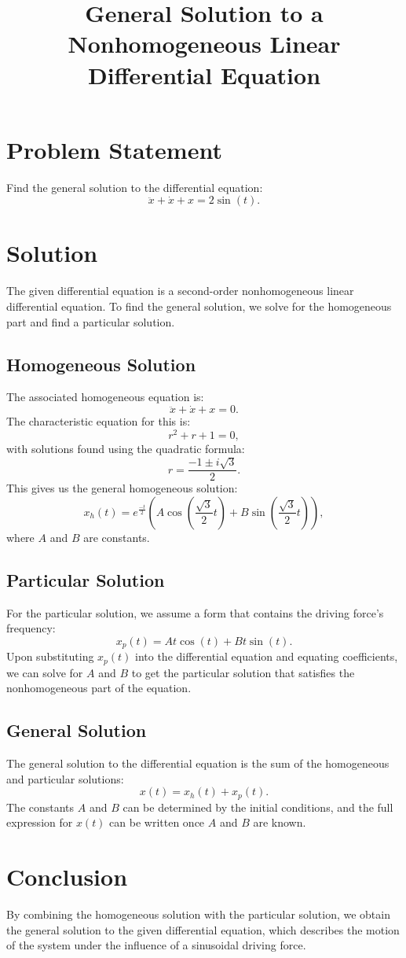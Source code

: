\documentclass{article}
\begin{document}
\title{General Solution to a Nonhomogeneous Linear Differential Equation}
\date{}
\maketitle

\section*{Problem Statement}
Find the general solution to the differential equation:
\[ \ddot{x} + \dot{x} + x = 2\sin(t). \]

\section*{Solution}
The given differential equation is a second-order nonhomogeneous linear differential equation. To find the general solution, we solve for the homogeneous part and find a particular solution.

\subsection*{Homogeneous Solution}
The associated homogeneous equation is:
\[ \ddot{x} + \dot{x} + x = 0. \]
The characteristic equation for this is:
\[ r^2 + r + 1 = 0, \]
with solutions found using the quadratic formula:
\[ r = \frac{-1 \pm i\sqrt{3}}{2}. \]
This gives us the general homogeneous solution:
\[ x_h(t) = e^{\frac{-t}{2}}\left( A\cos\left(\frac{\sqrt{3}}{2}t\right) + B\sin\left(\frac{\sqrt{3}}{2}t\right) \right), \]
where \( A \) and \( B \) are constants.

\subsection*{Particular Solution}
For the particular solution, we assume a form that contains the driving force's frequency:
\[ x_p(t) = At\cos(t) + Bt\sin(t). \]
Upon substituting \( x_p(t) \) into the differential equation and equating coefficients, we can solve for \( A \) and \( B \) to get the particular solution that satisfies the nonhomogeneous part of the equation.

\subsection*{General Solution}
The general solution to the differential equation is the sum of the homogeneous and particular solutions:
\[ x(t) = x_h(t) + x_p(t). \]
The constants \( A \) and \( B \) can be determined by the initial conditions, and the full expression for \( x(t) \) can be written once \( A \) and \( B \) are known.

\section*{Conclusion}
By combining the homogeneous solution with the particular solution, we obtain the general solution to the given differential equation, which describes the motion of the system under the influence of a sinusoidal driving force.
\end{document}
